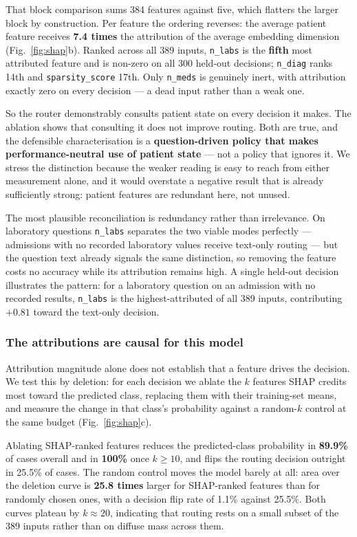 That block comparison sums 384 features against five, which flatters the
larger block by construction. Per feature the ordering reverses: the average
patient feature receives \textbf{7.4 times} the attribution of the average
embedding dimension (Fig.~\ref{fig:shap}b). Ranked across all 389 inputs,
\texttt{n\_labs} is the \textbf{fifth} most attributed feature and is non-zero
on all 300 held-out decisions; \texttt{n\_diag} ranks 14th and
\texttt{sparsity\_score} 17th. Only \texttt{n\_meds} is genuinely inert, with
attribution exactly zero on every decision --- a dead input rather than a weak
one.

So the router demonstrably consults patient state on every decision it makes.
The ablation shows that consulting it does not improve routing. Both are true,
and the defensible characterisation is a \textbf{question-driven policy that
makes performance-neutral use of patient state} --- not a policy that ignores
it. We stress the distinction because the weaker reading is easy to reach from
either measurement alone, and it would overstate a negative result that is
already sufficiently strong: patient features are redundant here, not unused.

The most plausible reconciliation is redundancy rather than irrelevance. On
laboratory questions \texttt{n\_labs} separates the two viable modes perfectly
--- admissions with no recorded laboratory values receive text-only routing ---
but the question text already signals the same distinction, so removing the
feature costs no accuracy while its attribution remains high. A single
held-out decision illustrates the pattern: for a laboratory question on an
admission with no recorded results, \texttt{n\_labs} is the highest-attributed
of all 389 inputs, contributing $+0.81$ toward the text-only decision.

\subsubsection*{The attributions are causal for this model}

Attribution magnitude alone does not establish that a feature drives the
decision. We test this by deletion: for each decision we ablate the $k$
features SHAP credits most toward the predicted class, replacing them with
their training-set means, and measure the change in that class's probability
against a random-$k$ control at the same budget (Fig.~\ref{fig:shap}c).

Ablating SHAP-ranked features reduces the predicted-class probability in
\textbf{89.9\%} of cases overall and in \textbf{100\%} once $k \geq 10$, and
flips the routing decision outright in 25.5\% of cases. The random control
moves the model barely at all: area over the deletion curve is \textbf{25.8
times} larger for SHAP-ranked features than for randomly chosen ones, with a
decision flip rate of 1.1\% against 25.5\%. Both curves plateau by $k \approx
20$, indicating that routing rests on a small subset of the 389 inputs rather
than on diffuse mass across them.

